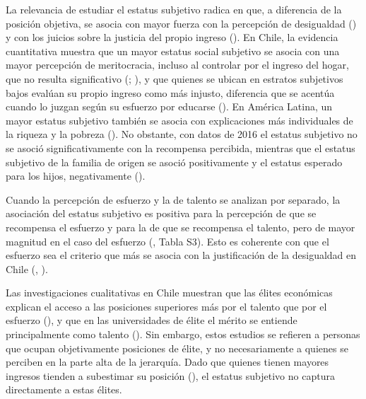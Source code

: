 \documentclass[
  spanish,
  a4paper,
  oneside]{scrbook}
\begin{document}
La relevancia de estudiar el estatus subjetivo radica en que, a
diferencia de la posición objetiva, se asocia con mayor fuerza con la
percepción de desigualdad () y con los juicios sobre la justicia del propio ingreso
(). En Chile, la evidencia cuantitativa muestra que un mayor estatus
social subjetivo se asocia con una mayor percepción de meritocracia,
incluso al controlar por el ingreso del hogar, que no resulta
significativo (;
), y que quienes se ubican en estratos subjetivos bajos evalúan su
propio ingreso como más injusto, diferencia que se acentúa cuando lo
juzgan según su esfuerzo por educarse
(). En
América Latina, un mayor estatus subjetivo también se asocia con
explicaciones más individuales de la riqueza y la pobreza
(). No obstante, con datos
de 2016 el estatus subjetivo no se asoció significativamente con la
recompensa percibida, mientras que el estatus subjetivo de la familia de
origen se asoció positivamente y el estatus esperado para los hijos,
negativamente ().

Cuando la percepción de esfuerzo y la de talento se analizan por
separado, la asociación del estatus subjetivo es positiva para la
percepción de que se recompensa el esfuerzo y para la de que se
recompensa el talento, pero de mayor magnitud en el caso del esfuerzo
(, Tabla S3). Esto es coherente con que el esfuerzo sea el criterio
que más se asocia con la justificación de la desigualdad en Chile
(,
).

Las investigaciones cualitativas en Chile muestran que las élites
económicas explican el acceso a las posiciones superiores más por el
talento que por el esfuerzo
(), y que en las universidades de élite el mérito se entiende
principalmente como talento
(). Sin embargo, estos estudios se refieren a personas que ocupan
objetivamente posiciones de élite, y no necesariamente a quienes se
perciben en la parte alta de la jerarquía. Dado que quienes tienen
mayores ingresos tienden a subestimar su posición
(),
el estatus subjetivo no captura directamente a estas élites.
\end{document}
